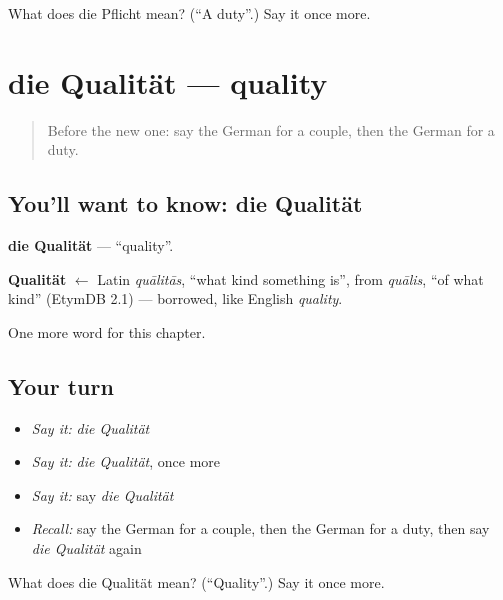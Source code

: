 \begin{tcolorbox}[breakable,colback=teal!4,colframe=teal!35!black,title={Before you move on}]
What does die Pflicht mean? (\textquotedblleft{}A duty\textquotedblright{}.) Say it once more.
\end{tcolorbox}
\section[die Qualität]{die Qualität — quality}

\label{lesson:GE-C236-qualitaet}



\begin{quote}
Before the new one: say the German for a couple, then the German for a duty.
\end{quote}

\subsection*{You'll want to know: die Qualität}
\textbf{die Qualität} — \textquotedblleft{}quality\textquotedblright{}.

\begin{cousinweb}
\textbf{Qualität} $\leftarrow$ Latin \emph{quālitās}, \textquotedblleft{}what kind something is\textquotedblright{}, from \emph{quālis}, \textquotedblleft{}of what kind\textquotedblright{} (EtymDB 2.1) — borrowed, like English \emph{quality}.
\end{cousinweb}

\begin{grammarlens}[title={What you've built}]
One more word for this chapter.
\end{grammarlens}

\subsection*{Your turn}
\begin{itemize}
\raggedright
  \item \emph{Say it:} \emph{die Qualität}
  \item \emph{Say it:} \emph{die Qualität}, once more
  \item \emph{Say it:} say \emph{die Qualität}
  \item \emph{Recall:} say the German for a couple, then the German for a duty, then say \emph{die Qualität} again
\end{itemize}

\begin{tcolorbox}[breakable,colback=teal!4,colframe=teal!35!black,title={Before you move on}]
What does die Qualität mean? (\textquotedblleft{}Quality\textquotedblright{}.) Say it once more.
\end{tcolorbox}
